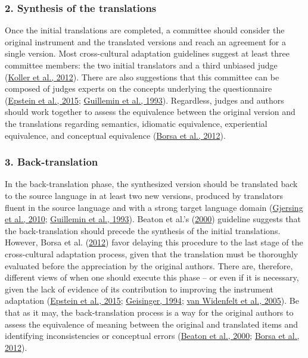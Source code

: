 \documentclass[
  ,doc,11pt, twoside,floatsintext]{apa6}
\begin{document}
\hypertarget{synthesis-of-the-translations}{%
\subsubsection{2. Synthesis of the translations}\label{synthesis-of-the-translations}}

Once the initial translations are completed, a committee should consider the original instrument and the translated versions and reach an agreement for a single version. Most cross-cultural adaptation guidelines suggest at least three committee members: the two initial translators and a third unbiased judge (\protect\hyperlink{ref-koller2012}{Koller et al., 2012}). There are also suggestions that this committee can be composed of judges experts on the concepts underlying the questionnaire (\protect\hyperlink{ref-epstein2015}{Epstein et al., 2015}; \protect\hyperlink{ref-guillemin1993}{Guillemin et al., 1993}). Regardless, judges and authors should work together to assess the equivalence between the original version and the translations regarding semantics, idiomatic equivalence, experiential equivalence, and conceptual equivalence (\protect\hyperlink{ref-borsaAdaptacaoValidacaoInstrumentos2012}{Borsa et al., 2012}).

\hypertarget{back-translation}{%
\subsubsection{3. Back-translation}\label{back-translation}}

In the back-translation phase, the synthesized version should be translated back to the source language in at least two new versions, produced by translators fluent in the source language and with a strong target language domain (\protect\hyperlink{ref-gjersing2010}{Gjersing et al., 2010}; \protect\hyperlink{ref-guillemin1993}{Guillemin et al., 1993}). Beaton et al.'s (\protect\hyperlink{ref-beaton2000}{2000}) guideline suggests that the back-translation should precede the synthesis of the initial translations. However, Borsa et al. (\protect\hyperlink{ref-borsaAdaptacaoValidacaoInstrumentos2012}{2012}) favor delaying this procedure to the last stage of the cross-cultural adaptation process, given that the translation must be thoroughly evaluated before the appreciation by the original authors. There are, therefore, different views of when one should execute this phase -- or even if it is necessary, given the lack of evidence of its contribution to improving the instrument adaptation (\protect\hyperlink{ref-epstein2015}{Epstein et al., 2015}; \protect\hyperlink{ref-geisinger1994}{Geisinger, 1994}; \protect\hyperlink{ref-vanwidenfelt2005}{van Widenfelt et al., 2005}). Be that as it may, the back-translation process is a way for the original authors to assess the equivalence of meaning between the original and translated items and identifying inconsistencies or conceptual errors (\protect\hyperlink{ref-beaton2000}{Beaton et al., 2000}; \protect\hyperlink{ref-borsaAdaptacaoValidacaoInstrumentos2012}{Borsa et al., 2012}).
\end{document}
